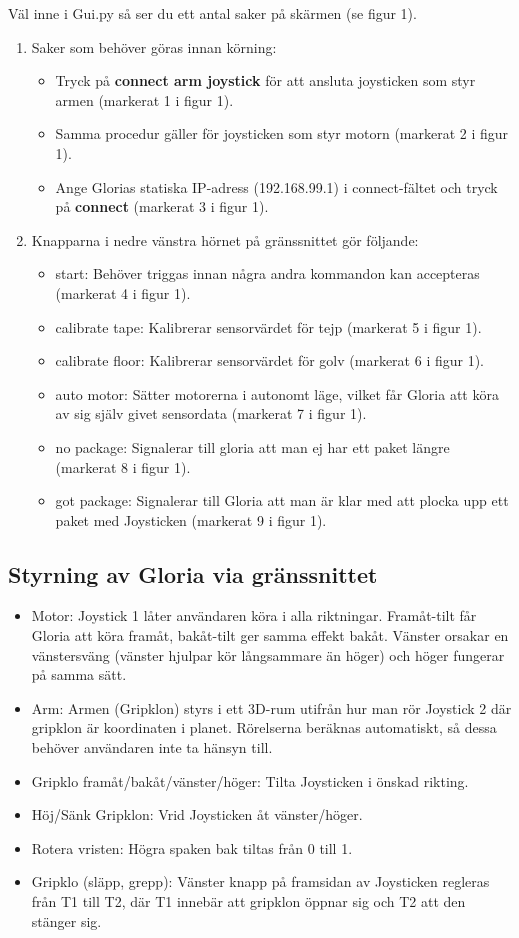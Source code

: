 Väl inne i Gui.py så ser du ett antal saker på skärmen (se figur 1).
\begin{enumerate}
	\item Saker som behöver göras innan körning:
	\begin{itemize}
		\item Tryck på \textbf{connect arm joystick} för att ansluta joysticken som styr armen (markerat 1 i figur 1).
		\item Samma procedur gäller för joysticken som styr motorn (markerat 2 i figur 1).
		\item Ange Glorias statiska IP-adress (192.168.99.1) i connect-fältet och tryck på \textbf{connect} (markerat 3 i figur 1).
	\end{itemize}
	\item Knapparna i nedre vänstra hörnet på gränssnittet gör följande:
	\begin{itemize}
		\item start: Behöver triggas innan några andra kommandon kan accepteras (markerat 4 i figur 1).
		\item calibrate tape: Kalibrerar sensorvärdet för tejp (markerat 5 i figur 1).
		\item calibrate floor: Kalibrerar sensorvärdet för golv (markerat 6 i figur 1).
		\item auto motor: Sätter motorerna i autonomt läge, vilket får Gloria att köra av sig själv givet sensordata (markerat 7 i figur 1).		
		\item no package: Signalerar till gloria att man ej har ett paket längre (markerat 8 i figur 1).
		\item got package: Signalerar till Gloria att man är klar med att plocka upp ett paket med Joysticken (markerat 9 i figur 1).
	\end{itemize}
\end{enumerate}
\subsection{Styrning av Gloria via gränssnittet}
	\begin{itemize}	
		\item Motor: Joystick 1 låter användaren köra i alla riktningar. Framåt-tilt får Gloria att köra framåt, bakåt-tilt ger samma effekt bakåt. Vänster orsakar en vänstersväng (vänster hjulpar kör långsammare än höger) och höger fungerar på samma sätt.
		\item Arm: Armen (Gripklon) styrs i ett 3D-rum utifrån hur man rör Joystick 2 där gripklon är koordinaten i planet. Rörelserna beräknas automatiskt, så dessa behöver användaren inte ta hänsyn till. 
		\item Gripklo framåt/bakåt/vänster/höger: Tilta Joysticken i önskad rikting.
		\item Höj/Sänk Gripklon: Vrid Joysticken åt vänster/höger.
		\item Rotera vristen: Högra spaken bak tiltas från 0 till 1.
		\item Gripklo (släpp, grepp): Vänster knapp på framsidan av Joysticken regleras från T1 till T2, där T1 innebär att gripklon öppnar sig och T2 att den stänger sig.
	\end{itemize}
